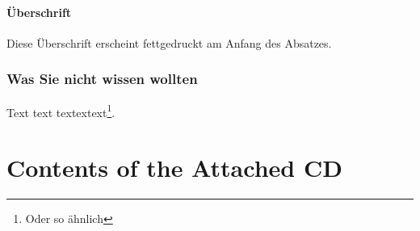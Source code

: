 \documentclass[11pt,a4paper,twoside]{article}
\begin{document}
\paragraph{Überschrift}
Diese Überschrift erscheint fettgedruckt am Anfang des Absatzes.

\subsubsection{Was Sie nicht wissen wollten}

Text text textextext\footnote{Oder so ähnlich}.

\fi


\cleardoublepage
\fancyhead[LE,RO,LO,RE]{} %
\section*{Contents of the Attached CD}

\cleardoublepage










\end{document}
